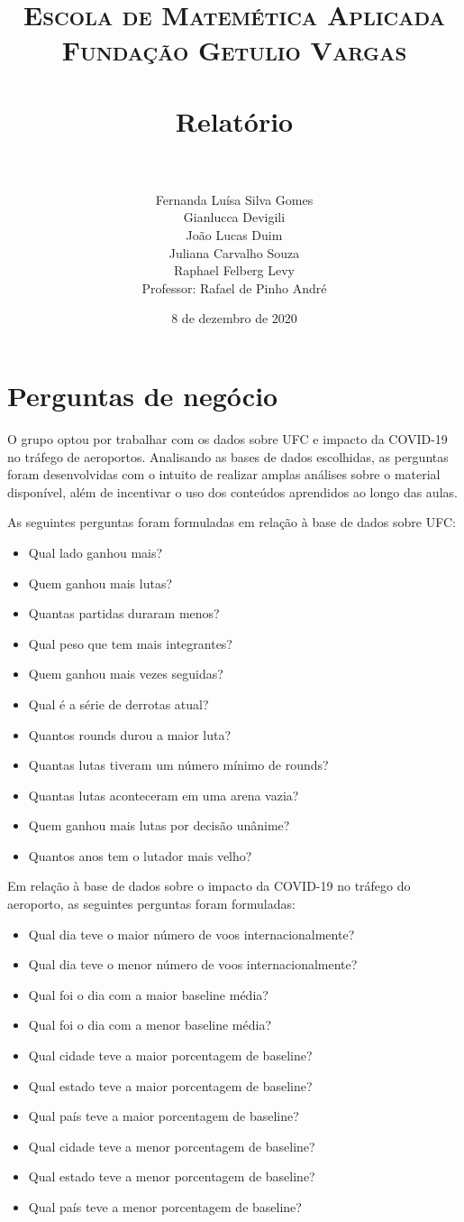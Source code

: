 \documentclass{article}
\title{	
\normalfont \normalsize 
\textsc{Escola de Matemética Aplicada} \\
\textsc{Fundação Getulio Vargas}\\ [25pt] 
\horrule{0.5pt} \\[0.4cm] 
\huge Relatório \\ 
\horrule{2pt} \\[0.5cm] 
}
\author{Fernanda Luísa Silva Gomes \\ Gianlucca Devigili \\ João Lucas Duim\\ Juliana Carvalho Souza \\ Raphael Felberg Levy\\[0.1cm]{Professor: Rafael de Pinho André}}
\date{8 de dezembro de 2020}
\begin{document}
\maketitle

\section{Perguntas de negócio}
O grupo optou por trabalhar com os dados sobre UFC e impacto da COVID-19 no tráfego de aeroportos. Analisando as bases de dados escolhidas, as perguntas foram desenvolvidas com o intuito de realizar amplas análises sobre o material disponível, além de incentivar o uso dos conteúdos aprendidos ao longo das aulas. 
\par As seguintes perguntas foram formuladas em relação à base de dados sobre UFC:
\begin{itemize}
    \item Qual lado ganhou mais?
    \item Quem ganhou mais lutas?
    \item Quantas partidas duraram menos?
    \item Qual peso que tem mais integrantes?
    \item Quem ganhou mais vezes seguidas?
    \item Qual é a série de derrotas atual?
    \item Quantos rounds durou a maior luta?
    \item Quantas lutas tiveram um número mínimo de rounds?
    \item Quantas lutas aconteceram em uma arena vazia?
    \item Quem ganhou mais lutas por decisão unânime?
    \item Quantos anos tem o lutador mais velho? 
\end{itemize}

\par Em relação à base de dados sobre o impacto da COVID-19 no tráfego do aeroporto, as seguintes perguntas foram formuladas:

\begin{itemize}
    \item Qual dia teve o maior número de voos internacionalmente?
    \item Qual dia teve o menor número de voos internacionalmente?
    \item Qual foi o dia com a maior baseline média?
    \item Qual foi o dia com a menor baseline média?
    \item Qual cidade teve a maior porcentagem de baseline?
    \item Qual estado teve a maior porcentagem de baseline?
    \item Qual país teve a maior porcentagem de baseline?
    \item Qual cidade teve a menor porcentagem de baseline?
    \item Qual estado teve a menor porcentagem de baseline?
    \item Qual país teve a menor porcentagem de baseline?
\end{itemize}
\end{document}
